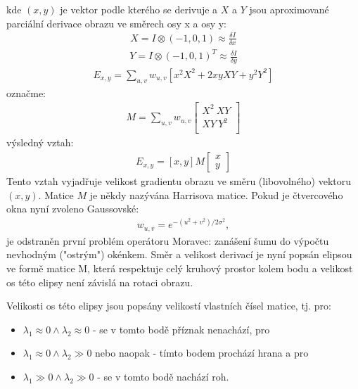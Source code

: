 kde $(x,y)$ je vektor podle kterého se derivuje a $X$ a $Y$ jsou aproximované parciální derivace obrazu ve směrech osy x a osy y:
\begin{align}
X = I \otimes (-1, 0, 1) \approx \frac{\delta I}{\delta x}
\end{align}
\begin{align}
Y = I \otimes (-1, 0, 1)^T \approx \frac{\delta I}{\delta y}
\end{align}
\begin{align}
E_{x,y} = \sum_{u,v} w_{u,v} [x^2X^2 + 2xyXY + y^2Y^2]
\end{align}
označme:
\begin{align}
M = \sum_{u,v} w_{u,v} 
\begin{bmatrix}
X^2  \  XY \\
XY    \ Y^2 \\
\end{bmatrix}
\end{align}
výsledný vztah:
\begin{align}
E_{x,y} = [x, y] M \begin{bmatrix} x \\ y \end{bmatrix}
\end{align}
Tento vztah vyjadřuje velikost gradientu obrazu ve směru (libovolného) vektoru $(x,y)$. Matice $M$ je někdy nazývána Harrisova matice.
Pokud je čtvercového okna nyní zvoleno Gaussovské:
\begin{align}
w_{u,v} = e^{-(u^2 + v^2)/2\sigma^2},
\end{align}
je odstraněn první problém operátoru Moravec: zanášení šumu do výpočtu nevhodným ("ostrým") okénkem. Směr a velikost derivací je nyní popsán elipsou ve formě matice M, která respektuje celý kruhový prostor kolem bodu a velikost os této elipsy není závislá na rotaci obrazu. 

Velikosti os této elipsy jsou popsány velikostí vlastních čísel matice, tj. pro:

\begin{itemize}
	\item ${\lambda_1 \approx 0 \wedge \lambda_2 \approx 0}$ - se v tomto bodě příznak nenachází, pro
	\item ${\lambda_1 \approx 0 \wedge \lambda_2 \gg 0}$ nebo naopak - tímto bodem prochází hrana a pro
	\item ${\lambda_1 \gg 0 \wedge \lambda_2 \gg 0}$  - se v tomto bodě nachází roh.
\end{itemize}

